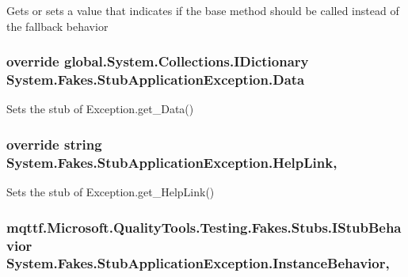 Gets or sets a value that indicates if the base method should be called instead of the fallback behavior

\hypertarget{class_system_1_1_fakes_1_1_stub_application_exception_aa6a0b8d1704ccaf27bddb16e7435d3e8}{
\subsubsection[{Data}]{\setlength{\rightskip}{0pt plus 5cm}override global.\-System.\-Collections.\-I\-Dictionary System.\-Fakes.\-Stub\-Application\-Exception.\-Data\hspace{0.3cm}{\ttfamily [get]}}}\label{class_system_1_1_fakes_1_1_stub_application_exception_aa6a0b8d1704ccaf27bddb16e7435d3e8}


Sets the stub of Exception.\-get\-\_\-\-Data()

\hypertarget{class_system_1_1_fakes_1_1_stub_application_exception_ac35a9dd52d15eb63cb33d25e8f40164a}{
\subsubsection[{Help\-Link}]{\setlength{\rightskip}{0pt plus 5cm}override string System.\-Fakes.\-Stub\-Application\-Exception.\-Help\-Link\hspace{0.3cm}{\ttfamily [get]}, {\ttfamily [set]}}}\label{class_system_1_1_fakes_1_1_stub_application_exception_ac35a9dd52d15eb63cb33d25e8f40164a}


Sets the stub of Exception.\-get\-\_\-\-Help\-Link()

\hypertarget{class_system_1_1_fakes_1_1_stub_application_exception_a04356b0df739300ebcdcdb7fcfa89d44}{
\subsubsection[{Instance\-Behavior}]{\setlength{\rightskip}{0pt plus 5cm}mqttf.\-Microsoft.\-Quality\-Tools.\-Testing.\-Fakes.\-Stubs.\-I\-Stub\-Behavior System.\-Fakes.\-Stub\-Application\-Exception.\-Instance\-Behavior\hspace{0.3cm}{\ttfamily [get]}, {\ttfamily [set]}}}\label{class_system_1_1_fakes_1_1_stub_application_exception_a04356b0df739300ebcdcdb7fcfa89d44}


